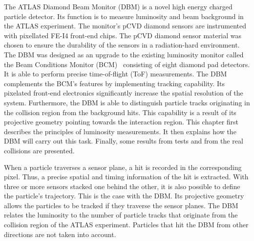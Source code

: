 \documentclass[12pt]{packages/mytustyle}  %
\begin{document}
The ATLAS Diamond Beam Monitor (DBM) is a novel high energy charged particle detector. Its function is to measure luminosity and beam background in the ATLAS experiment. The monitor's pCVD diamond sensors are instrumented with pixellated FE-I4 front-end chips. The pCVD diamond sensor material was chosen to ensure the durability of the sensors in a radiation-hard environment. The DBM was designed as an upgrade to the existing luminosity monitor called the Beam Conditions Monitor (BCM)~\cite{} consisting of eight diamond pad detectors. It is able to perform precise time-of-flight (ToF) measurements. The DBM complements the BCM's features by implementing tracking capability. Its pixelated front-end electronics significantly increase the spatial resolution of the system. Furthermore, the DBM is able to distinguish particle tracks originating in the collision region from the background hits. This capability is a result of its projective geometry pointing towards the interaction region. This chapter first describes the principles of luminosity measurements. It then explains how the DBM will carry out this task. Finally, some results from tests and from the real collisions are presented. 

When a particle traverses a sensor plane, a hit is recorded in the corresponding pixel. Thus, a precise spatial and timing information of the hit is extracted. With three or more sensors stacked one behind the other, it is also possible to define the particle's trajectory. This is the case with the DBM. Its projective geometry allows the particles to be tracked if they traverse the sensor planes. The DBM relates the luminosity to the number of particle tracks that originate from the collision region of the ATLAS experiment. Particles that hit the DBM from other directions are not taken into account.


\end{document}
